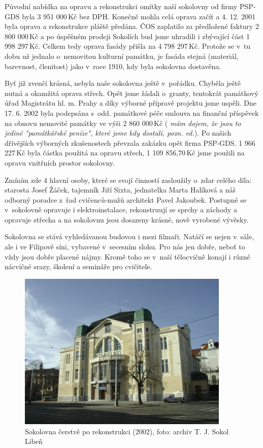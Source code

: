 \documentclass[a5paper, 11pt, twoside]{article}
\newcommand{\pozned}[1]{%
\textit{#1}}
\begin{document}
Původní nabídka na opravu a rekonstrukci omítky naší sokolovny od firmy
PSP-GDS byla 3 951 000\,Kč bez DPH. Konečně mohla celá oprava začít a 4.
12. 2001 byla oprava a rekonstrukce pláště předána. ČOS zaplatilo za
předložené faktury 2 800 000\,Kč a po úspěšném prodeji Sokolích bud jsme
uhradili i zbývající část 1 998 297\,Kč. Celkem tedy oprava fasády přišla
na 4 798 297\,Kč. Protože se v~tu dobu už jednalo o~nemovitou kulturní
památku, je fasáda stejná (materiál, barevnost, členitost) jako v~roce
1910, kdy byla sokolovna dostavěna.

Byť již zvenčí krásná, nebyla naše sokolovna ještě v~pořádku. Chyběla
ještě nutná a okamžitá oprava střech. Opět jsme žádali o~granty,
tentokrát památkový úřad Magistrátu hl. m. Prahy a díky výborné přípravě
projektu jsme uspěli. Dne 17. 6. 2002 byla podepsána s~odd. památkové
péče smlouva na finanční příspěvek na obnovu nemovité památky ve výši 2
860 000\,Kč (\pozned{mám dojem, že jsou to jediné "památkářské peníze",
které jsme kdy dostali, pozn. ed.}). Po našich dřívějších výborných
zkušenostech převzala zakázku opět firma PSP-GDS. 1 966 227\,Kč byla
částka použitá na opravu střech, 1 109 856,70\,Kč jsme použili na opravu
vnitřních prostor sokolovny.

Zmíním zde 4 hlavní osoby, které se svojí činností zasloužily o~zdar
celého díla: starosta Josef Žáček, tajemník Jiří Sixta, jednatelka Marta
Halíková a náš odborný poradce z~řad cvičenců-mužů architekt Pavel
Jakoubek. Postupně se v~sokolovně opravuje i elektroinstalace,
rekonstruují se sprchy a záchody a opravuje střecha a na sokolovnu jsou
dosazeny krásné, nově vyrobené vývěsky.

Sokolovna se stává vyhledávanou budovou i mezi filmaři. Natáčí se nejen
v~sále, ale i ve Filipově síni, vybavené v~secesním slohu. Pro nás jen
dobře, neboť to vždy jsou dobře placené nájmy. Kromě toho se v~naší
tělocvičně konají i různé nácvičné srazy, školení a semináře pro
cvičitele.

\begin{figure}[h!]
  \centering 
  \includegraphics[width=0.9\textwidth]{img/46_sokolovna.jpg}
  \caption*{Sokolovna čerstvě po rekonstrukci (2002), foto: archiv T. J. Sokol
  Libeň}
\end{figure}
\end{document}
